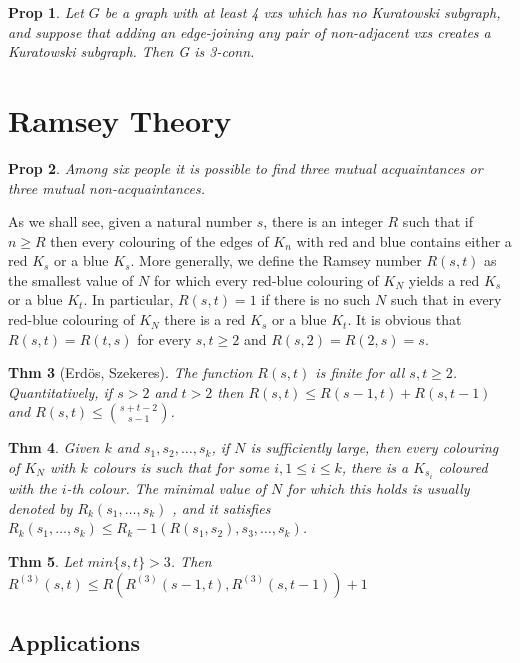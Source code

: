 \documentclass[11pt, fleqn, a4paper, landscape]{article}
\theoremstyle{plain} %
\newtheorem{thm}{Thm}
\newtheorem{pro}[thm]{Prop}
\theoremstyle{remark} %
\theoremstyle{definition} %
\begin{document}
\begin{multicols}{5}
\begin{pro}
Let $G$ be a graph with at least 4 vxs which has no Kuratowski subgraph, and suppose that adding an edge-joining any pair of non-adjacent vxs creates a Kuratowski subgraph.
Then G is 3-conn.
\end{pro}

\section{Ramsey Theory}

\begin{pro}
Among six people it is possible to find three mutual acquaintances or three mutual non-acquaintances.
\end{pro}

As we shall see, given a natural number $s$, there is an integer $R$ such that if $n \ge R$ then every colouring of the edges of $K_n$ with red and blue contains either a red $K_s$ or a blue $K_s$. More generally, we define the Ramsey number $R(s, t)$ as the smallest value of $N$ for which every red-blue colouring of $K_N$ yields a red $K_s$ or a blue $K_t$. In particular, $R(s, t) = 1$ if there is no such $N$ such that in every red-blue
colouring of $K_N$ there is a red $K_s$ or a blue $K_t$. It is obvious that
$ R(s, t) = R(t, s)$ for every $s, t \ge 2$ and $R(s, 2) = R(2, s) = s$. 

\begin{thm}[Erdös, Szekeres]
The function $R(s, t)$ is finite for all $s, t \ge 2$. Quantitatively, if $s > 2 $ and $t > 2$ then $R(s, t)\le R(s - 1, t) + R(s, t - 1)$ and $R(s, t) \le \binom{s+t-2}{s-1}$.
\end{thm}

\begin{thm}
Given $k$ and $s_1, s_2, \dots , s_k$, if $N$ is sufficiently large, then every colouring of $K_N$ with $k$ colours is such that for some $i, 1 \le i \le k$, there is a $K_{s_i}$ coloured with the $i$-th colour. The
minimal value of $N$ for which this holds is usually denoted by $R_k(s_1, \dots , s_k)$ , and it satisfies $R_k(s_1, \dots , s_k)\le R_k-1(R(s_1, s_2), s_3, \dots , s_k)$.
\end{thm}

\begin{thm}
Let $min\{s, t\} > 3$. Then
$R^{(3)}(s, t) \le R(R^{(3)}(s - 1, t),R^{(3)}(s, t - 1)) + 1$
\end{thm}

\subsection{Applications}


\end{multicols}
\end{document}
